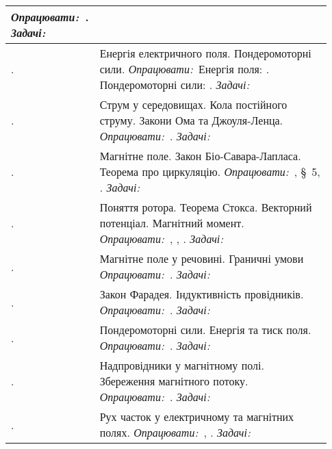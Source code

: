 \documentclass{Syllabus}
\def\lit{\textit{Опрацювати:\ }}
\def\probl{\textit{Задачі:\ }}
\begin{document}
\begin{center}
\begin{longtable}{|>{\arraybackslash}m{0.03\linewidth}|>{\raggedright\arraybackslash}m{0.9\linewidth}|}
        \newline \lit{}\cite[\S~12 -- 15]{Siv3}. \probl{}\cite[\S\ 1.6]{Ponomarenko}
		\\\hline
		\rownumber. & Енергія електричного поля. Пондеромоторні сили.
        \newline \lit{}Енергія поля: \cite[\S~28, 29, 30]{Siv3}. Пондеромоторні сили: \cite[\S~32, 33]{Siv3}. \probl{}\cite[\S\ 1.8, 1.9]{Ponomarenko}
		\\\hline
		\rownumber. & Струм у середовищах. Кола постійного струму. Закони Ома та Джоуля-Ленца. 
        \newline \lit{}\cite[Глава V]{ZilbermanElectro}. \probl{}\cite[\S\S\ 2.1, 2.2, 2.3]{Ponomarenko}
		\\\hline
		\rownumber. & Магнітне поле. Закон Біо-Савара-Лапласа. Теорема про циркуляцію.
        \newline \lit{}\cite[Глава I]{ZilbermanElectro},  \S~5, \cite[\S~42, 47]{Siv3}. \probl{}\cite[\S\ 3.1]{Ponomarenko}
		\\\hline 
		\rownumber. &  Поняття ротора. Теорема Стокса. Векторний потенціал. Магнітний момент.
        \newline \lit{}\cite[Глава VII, \S~80]{ZilbermanElectro}, \cite[\S~49, 50]{Siv3}, \cite[6.2 -- 6.5]{berkeley2}. \probl{}\cite[\S\ 3.2]{Ponomarenko}
		\\\hline
		\rownumber. & Магнітне поле у речовині. Гра\-ничні умови
        \newline \lit{}\cite[Глава VIII]{ZilbermanElectro}. \probl{}\cite[\S\ 3.3]{Ponomarenko}
    	\\\hline
		\rownumber. & Закон Фарадея. Індуктивність провідників.
        \newline \lit{}\cite[Глава IX]{Kalashnikov}. \probl{}\cite[\S\ 4.1]{Ponomarenko}
		\\\hline
		\rownumber. & Пондеромоторні сили. Енергія та тиск поля. 
        \newline \lit{}\cite[Глава X]{Kalashnikov}. \probl{}\cite[\S\ 3.4]{Ponomarenko} 
		\\\hline
		\rownumber. & Надпровідники у магнітному полі. Збереження магнітного потоку.
        \newline \lit{}\cite[\S~90]{Siv3}. \probl{}\cite[\S\ 4.2]{Ponomarenko} 
        \\\hline 
		\rownumber. & Рух часток у електричному та магнітних полях.
        \newline \lit{}\cite[Глава V]{Siv3}, \cite[Глава XVII]{Kalashnikov}. \probl{}\cite[Розділ 5]{Ponomarenko} 

\end{longtable}
\end{center}
\end{document}
